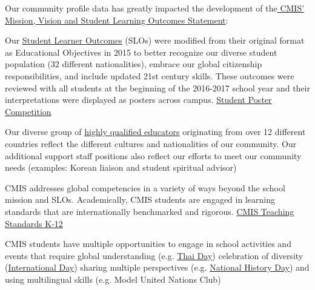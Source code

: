 

\begin{findings}
Our community profile data has greatly impacted the development of the\href{http://cmis.ac.th/about/vision}{ CMIS’ Mission, Vision and Student Learning Outcomes Statement}:

Our \href{https://docs.google.com/document/d/1bIbV9pgGz2vpXYJdnRzL_Od5PS35egy7lgBOBuszgD4/edit}{Student Learner Outcomes} (SLOs) were modified from their original format as Educational Objectives in 2015 to better recognize our diverse student population (32 different nationalities), embrace our global citizenship responsibilities, and include updated 21st century skills. These outcomes were reviewed with all students at the beginning of the 2016-2017 school year and their interpretations were displayed as posters across campus. \href{https://docs.google.com/a/cmis.ac.th/presentation/d/1bdi1LZUjWbGKOyB0XR9CGyoY2xLY39SZVKhiHTIJGxc/edit?usp=sharing}{Student Poster Competition}

Our diverse group of \href{http://www.cmis.ac.th/about/faculty}{highly qualified educators} originating from over 12 different countries reflect the different cultures and nationalities of our community. Our additional support staff positions also reflect our efforts to meet our community needs (examples: Korean liaison and student spiritual advisor)

CMIS addresses global competencies in a variety of ways beyond the school mission and SLOs. Academically, CMIS students are engaged in learning standards that are internationally benchmarked and rigorous. \href{https://drive.google.com/drive/folders/0ByVFfrm0zfolMVRQYmI1aGlRNDQ}{CMIS Teaching Standards K-12}

CMIS students have multiple opportunities to engage in school activities and events that require global understanding (e.g. \href{http://gallery.cmis.ac.th/zp-core/full-image.php?a=2010-2011/thai-day-2011/website&i=_mg_3802-version-2.jpg&q=100&wmk=\%21&dsp=Protected\%20view&check=788a1e55c231186711f8dcc0876f4efd0daa0880}{Thai Day}) celebration of diversity (\href{http://gallery.cmis.ac.th/zp-core/full-image.php?a=2013-2014/international_day&i=_MG_6129.jpg&q=100&wmk=\%21&dsp=Protected\%20view&check=788a1e55c231186711f8dcc0876f4efd0daa0880}{International Day}) sharing multiple perspectives (e.g. \href{https://www.nhd.org/}{National History Day}) and using multilingual skills (e.g. Model United Nations Club) 


\end{findings}
